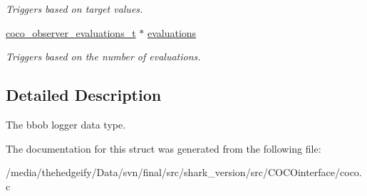 \begin{DoxyCompactItemize}
\begin{DoxyCompactList}\small\item\em Triggers based on target values. \end{DoxyCompactList}\item 
\hyperlink{structcoco__observer__evaluations__t}{coco\+\_\+observer\+\_\+evaluations\+\_\+t} $\ast$ \hyperlink{structlogger__bbob__data__t_a7c24b94568efafc12bf69847e63564bc}{evaluations}\hypertarget{structlogger__bbob__data__t_a7c24b94568efafc12bf69847e63564bc}{}\label{structlogger__bbob__data__t_a7c24b94568efafc12bf69847e63564bc}

\begin{DoxyCompactList}\small\item\em Triggers based on the number of evaluations. \end{DoxyCompactList}\end{DoxyCompactItemize}


\subsection{Detailed Description}
The bbob logger data type. 

The documentation for this struct was generated from the following file\+:\begin{DoxyCompactItemize}
\item 
/media/thehedgeify/\+Data/svn/final/src/shark\+\_\+version/src/\+C\+O\+C\+Ointerface/coco.\+c\end{DoxyCompactItemize}
